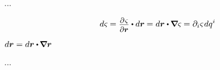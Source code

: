 ...

\begin{equation}
d \varsigma \hspace{-0.1ex}
=
\scalebox{0.9}{$ \displaystyle\frac{\raisebox{-0.2em}{$\partial \hspace{.15ex} \varsigma$}}{\raisebox{-0.05em}{$\partial \locationvector$}} $} \dotp d\locationvector \hspace{-0.1ex}
=
d\locationvector \dotp \hspace{-0.11ex} \boldnabla \varsigma \hspace{-0.1ex}
=
\partial_i \varsigma \hspace{.15ex} dq^i
\end{equation}

\vspace{1.1em}${
d\locationvector = d\locationvector \dotp \hspace{-0.2ex} \tikzmark{beginItsUnitTensorE} \boldnabla \locationvector \tikzmark{endItsUnitTensorE}
}$%

...

  

